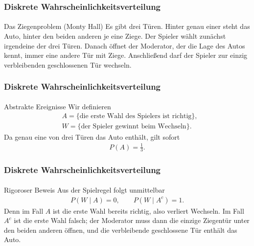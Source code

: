 \documentclass{beamer}
\begin{document}
\begin{frame}
    \frametitle{Diskrete Wahrscheinlichkeitsverteilung}
\framesubtitle{}

\begin{block}{Das Ziegenproblem (Monty Hall)}
Es gibt drei Türen. Hinter genau einer steht das Auto, hinter den beiden anderen je eine Ziege.
Der Spieler wählt zunächst irgendeine der drei Türen.
Danach öffnet der Moderator, der die Lage des Autos kennt, immer eine andere Tür mit Ziege.
Anschließend darf der Spieler zur einzig verbleibenden geschlossenen Tür wechseln.
\end{block}

 \end{frame}


\begin{frame}
    \frametitle{Diskrete Wahrscheinlichkeitsverteilung}
\framesubtitle{}

\begin{block}{Abstrakte Ereignisse}
Wir definieren
\begin{align*}
&A = \{\text{die erste Wahl des Spielers ist richtig}\},\\
&W = \{\text{der Spieler gewinnt beim Wechseln}\}.
\end{align*}
Da genau eine von drei Türen das Auto enthält, gilt sofort
\begin{align*}
P(A)=\frac13.
\end{align*}
\end{block}

 \end{frame}


\begin{frame}
    \frametitle{Diskrete Wahrscheinlichkeitsverteilung}
\framesubtitle{}

\begin{block}{Rigoroser Beweis}
Aus der Spielregel folgt unmittelbar
\begin{align*}
P(W \mid A)=0,
\qquad
P(W \mid A^c)=1.
\end{align*}
Denn im Fall \(A\) ist die erste Wahl bereits richtig, also verliert Wechseln.
Im Fall \(A^c\) ist die erste Wahl falsch; der Moderator muss dann die einzige Ziegentür unter den beiden anderen öffnen, und die verbleibende geschlossene Tür enthält das Auto.
\end{block}

 \end{frame}
\end{document}
